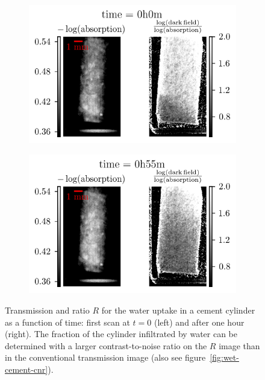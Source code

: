 \begin{figure}[htb]
    \centering
    \begin{subfigure}[b]{.49\textwidth}
    \centering
    \includegraphics[width=\textwidth]{gfx/wet-cement/0.png}
    \caption{}
    \label{fig:wet-cement-0}
    \end{subfigure}
    \hfill
    \begin{subfigure}[b]{.49\textwidth}
    \centering
    \includegraphics[width=\textwidth]{gfx/wet-cement/200.png}
    \caption{}
    \label{fig:wet-cement-200}
    \end{subfigure}
    \caption[Water uptake in cement.]{Transmission and ratio $R$ for the
    water uptake in a cement cylinder as a function of time: first scan at
$t=0$ (left) and after one hour (right). The fraction of the cylinder
infiltrated by water can be determined with a larger contrast-to-noise ratio
on the $R$ image than in the conventional transmission image (also see
figure~\ref{fig:wet-cement-cnr}).}
\label{fig:wet-cement}
\end{figure}


